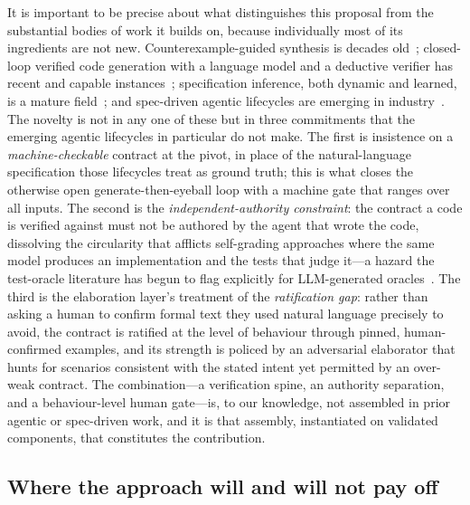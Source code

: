 It is important to be precise about what distinguishes this proposal from the
substantial bodies of work it builds on, because individually most of its
ingredients are not new. Counterexample-guided synthesis is decades
old~\cite{solarlezama2008sketching,alur2013sygus}; closed-loop verified code
generation with a language model and a deductive verifier has recent and capable
instances~\cite{sun2024clover,misu2024dafny,mugnier2025dafnypro}; specification
inference, both dynamic and learned, is a mature
field~\cite{ernst2007daikon,ma2025specgen,endres2024nl2postcond}; and
spec-driven agentic lifecycles are emerging in
industry~\cite{githubspeckit,awsaidlc,awskiro}. The novelty is not in any one of
these but in three commitments that the emerging agentic lifecycles in
particular do not make. The first is insistence on a \emph{machine-checkable}
contract at the pivot, in place of the natural-language specification those
lifecycles treat as ground truth; this is what closes the otherwise open
generate-then-eyeball loop with a machine gate that ranges over all inputs. The
second is the \emph{independent-authority constraint}: the contract a code is
verified against must not be authored by the agent that wrote the code,
dissolving the circularity that afflicts self-grading approaches where the same
model produces an implementation and the tests that judge it---a hazard the
test-oracle literature has begun to flag explicitly for LLM-generated
oracles~\cite{liu2026oracle,barr2015oracle}. The third is the elaboration layer's
treatment of the \emph{ratification gap}: rather than asking a human to confirm
formal text they used natural language precisely to avoid, the contract is
ratified at the level of behaviour through pinned, human-confirmed examples, and
its strength is policed by an adversarial elaborator that hunts for scenarios
consistent with the stated intent yet permitted by an over-weak contract. The
combination---a verification spine, an authority separation, and a
behaviour-level human gate---is, to our knowledge, not assembled in prior agentic
or spec-driven work, and it is that assembly, instantiated on validated
components, that constitutes the contribution.

\subsection{Where the approach will and will not pay off}\label{subsec:disc-payoff}

